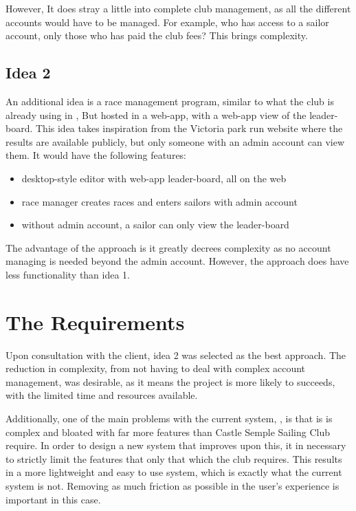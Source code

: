 \documentclass{l4proj}
\begin{document}
However, It does stray a little into complete club management, as all the different accounts would have to be managed. For example, who has access to a sailor account, only those who has paid the club fees? This brings complexity.

\subsection{Idea 2}
An additional idea is a race management program, similar to what the club is already using in \citet{sailwave}, But hosted in a web-app, with a web-app view of the leader-board. This idea takes inspiration from the Victoria park run website \citeyear{Parkrun} where the results are available publicly, but only someone with an admin account can view them. It would have the following features:
\begin{itemize}
    \item
    desktop-style editor with web-app leader-board, all on the web
    \item
    race manager creates races and enters sailors with admin account
    \item
    without admin account, a sailor can only view the leader-board
\end{itemize}

The advantage of the approach is it greatly decrees complexity as no account managing is needed beyond the admin account. However, the approach does have less functionality than idea 1.

\section{The Requirements}
Upon consultation with the client, idea 2 was selected as the best approach. The reduction in complexity, from not having to deal with complex account management, was desirable, as it means the project is more likely to succeeds, with the limited time and
resources available.

Additionally, one of the main problems with the current system, \citep{sailwave}, is that is is complex and bloated with far more features than Castle Semple Sailing Club require. In order to design a new system that improves upon this, it in necessary to strictly limit the features that only that which the club requires. This results in a more lightweight and easy to use system, which is exactly what the current system is not. Removing as much friction as possible in the user's experience is important in this case.
\end{document}
